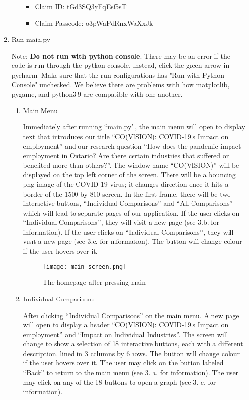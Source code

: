 \documentclass[fontsize=11pt]{article}
\begin{document}
\begin{enumerate}
\begin{enumerate}
\begin{itemize}
    \item Claim ID: tGd3SQ3yFqEsf5sT
    \item Claim Passcode: o3pWaPdRnxWaXxJk
\end{itemize}

\end{enumerate}

\item Run main.py

Note: \textbf{Do not run with python console}. There may be an error if the code is run through the python console. Instead, click the green arrow in pycharm. Make sure that the run configurations has "Run with Python Console" unchecked. We believe there are problems with how matplotlib, pygame, and python3.9 are compatible with one another.

\begin{enumerate}

\item Main Menu

Immediately after running ``main.py’’, the main menu will open to display text that introduces our title ``CO(VISION): COVID-19’s Impact on employment” and our research question ``How does the pandemic impact employment in Ontario? Are there certain industries that suffered or benefited more than others?”. The window name ``CO(VISION)” will be displayed on the top left corner of the screen. There will be a bouncing png image of the COVID-19 virus; it changes direction once it hits a border of the 1500 by 800 screen. In the first frame, there will be two interactive buttons, ``Individual Comparisons” and ``All Comparisons” which will lead to separate pages of our application. If the user clicks on ``Individual Comparisons’’, they will visit a new page (see 3.b. for information). If the user clicks on ``Individual Comparisons’’, they will visit a new page (see 3.e. for information). The button will change colour if the user hovers over it.

\begin{figure}[h!]
  \centering
  \caption{The homepage after pressing main}
\texttt{[image: main\_screen.png]}
\end{figure}

\raggedright
\item Individual Comparisons

After clicking ``Individual Comparisons” on the main menu. A new page will open to display a header ``CO(VISION): COVID-19’s Impact on employment” and ``Impact on Individual Industries”. The screen will change to show a selection of 18 interactive buttons, each with a different description, lined in 3 columns by 6 rows. The button will change colour if the user hovers over it. The user may click on the button labeled ``Back” to return to the main menu (see 3. a. for information). The user may click on any of the 18 buttons to open a graph (see 3. c. for information). \newline


\end{enumerate}
\end{enumerate}
\end{document}

